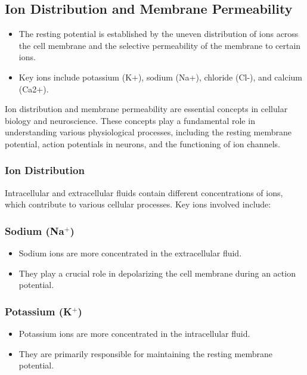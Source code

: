 \documentclass{article}
\begin{document}
\subsection{Ion Distribution and Membrane Permeability}
\begin{itemize}
    \item The resting potential is established by the uneven distribution of ions across the cell membrane and the selective permeability of the membrane to certain ions.
    \item Key ions include potassium (K+), sodium (Na+), chloride (Cl-), and calcium (Ca2+).
\end{itemize}
Ion distribution and membrane permeability are essential concepts in cellular biology and neuroscience. These concepts play a fundamental role in understanding various physiological processes, including the resting membrane potential, action potentials in neurons, and the functioning of ion channels.

\subsubsection{Ion Distribution}

Intracellular and extracellular fluids contain different concentrations of ions, which contribute to various cellular processes. Key ions involved include:

\subsubsection{Sodium (Na$^+$)}

\begin{itemize}
  \item Sodium ions are more concentrated in the extracellular fluid.
  \item They play a crucial role in depolarizing the cell membrane during an action potential.
\end{itemize}

\subsubsection{Potassium (K$^+$)}

\begin{itemize}
  \item Potassium ions are more concentrated in the intracellular fluid.
  \item They are primarily responsible for maintaining the resting membrane potential.
\end{itemize}
\end{document}
